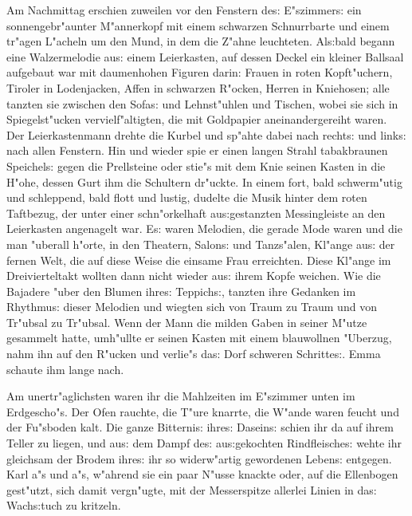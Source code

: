 \documentclass[oneside,12pt]{book}
\newcommand{\s}{s:}%
\begin{document}
Am Nachmittag erschien zuweilen vor den Fenstern de{\s}
E"szimmer{\s} ein sonnengebr"aunter M"annerkopf mit einem
schwarzen Schnurrbarte und einem tr"agen L"acheln um den Mund, in
dem die Z"ahne leuchteten. Al{\s}bald begann eine Walzermelodie
au{\s} einem Leierkasten, auf dessen Deckel ein kleiner Ballsaal
aufgebaut war mit daumenhohen Figuren darin: Frauen in roten
Kopft"uchern, Tiroler in Lodenjacken, Affen in schwarzen R"ocken,
Herren in Kniehosen; alle tanzten sie zwischen den Sofa{\s} und
Lehnst"uhlen und Tischen, wobei sie sich in Spiegelst"ucken
vervielf"altigten, die mit Goldpapier aneinandergereiht waren. Der
Leierkastenmann drehte die Kurbel und sp"ahte dabei nach recht{\s}
und link{\s} nach allen Fenstern. Hin und wieder spie er einen
langen Strahl tabakbraunen Speichel{\s} gegen die Prellsteine oder
stie"s mit dem Knie seinen Kasten in die H"ohe, dessen Gurt ihm
die Schultern dr"uckte. In einem fort, bald schwerm"utig und
schleppend, bald flott und lustig, dudelte die Musik hinter dem
roten Taftbezug, der unter einer schn"orkelhaft au{\s}gestanzten
Messingleiste an den Leierkasten angenagelt war. E{\s} waren
Melodien, die gerade Mode waren und die man "uberall h"orte, in
den Theatern, Salon{\s} und Tanzs"alen, Kl"ange au{\s} der fernen
Welt, die auf diese Weise die einsame Frau erreichten. Diese
Kl"ange im Dreivierteltakt wollten dann nicht wieder au{\s} ihrem
Kopfe weichen. Wie die Bajadere "uber den Blumen ihre{\s}
Teppich{\s}, tanzten ihre Gedanken im Rhythmu{\s} dieser Melodien
und wiegten sich von Traum zu Traum und von Tr"ubsal zu Tr"ubsal.
Wenn der Mann die milden Gaben in seiner M"utze gesammelt hatte,
umh"ullte er seinen Kasten mit einem blauwollnen "Uberzug, nahm
ihn auf den R"ucken und verlie"s da{\s} Dorf schweren
Schritte{\s}. Emma schaute ihm lange nach.

Am unertr"aglichsten waren ihr die Mahlzeiten im E"szimmer unten
im Erdgescho"s. Der Ofen rauchte, die T"ure knarrte, die W"ande
waren feucht und der Fu"sboden kalt. Die ganze Bitterni{\s}
ihre{\s} Dasein{\s} schien ihr da auf ihrem Teller zu liegen, und
au{\s} dem Dampf de{\s} au{\s}gekochten Rindfleische{\s} wehte ihr
gleichsam der Brodem ihre{\s} ihr so widerw"artig gewordenen
Leben{\s} entgegen. Karl a"s und a"s, w"ahrend sie ein paar N"usse
knackte oder, auf die Ellenbogen gest"utzt, sich damit vergn"ugte,
mit der Messerspitze allerlei Linien in da{\s} Wach{\s}tuch zu
kritzeln.
\end{document}
